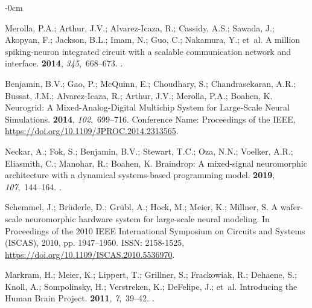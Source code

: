 \documentclass[brainsci, %
               review,submit,pdftex,moreauthors
               ]{Definitions/mdpi}
\begin{document}
\begin{adjustwidth}{-\extralength}{0cm}
\begin{thebibliography}{999}
  Merolla, P.A.; Arthur, J.V.; Alvarez-Icaza, R.; Cassidy, A.S.; Sawada, J.;
    Akopyan, F.; Jackson, B.L.; Imam, N.; Guo, C.; Nakamura, Y.;  et~al.
  \newblock A million spiking-neuron integrated circuit with a scalable
    communication network and interface.
   {\bf 2014}, {\em 345},~668--673.
  .
  
  Benjamin, B.V.; Gao, P.; McQuinn, E.; Choudhary, S.; Chandrasekaran, A.R.;
    Bussat, J.M.; Alvarez-Icaza, R.; Arthur, J.V.; Merolla, P.A.; Boahen, K.
  \newblock Neurogrid: {A} {Mixed}-{Analog}-{Digital} {Multichip} {System} for
    {Large}-{Scale} {Neural} {Simulations}.
   {\bf 2014}, {\em 102},~699--716.
  \newblock Conference Name: Proceedings of the IEEE,
    {\url{https://doi.org/10.1109/JPROC.2014.2313565}}.
  
  Neckar, A.; Fok, S.; Benjamin, B.V.; Stewart, T.C.; Oza, N.N.; Voelker, A.R.;
    Eliasmith, C.; Manohar, R.; Boahen, K.
  \newblock Braindrop: {A} mixed-signal neuromorphic architecture with a
    dynamical systems-based programming model.
   {\bf 2019}, {\em 107},~144--164.
  .
  
  Schemmel, J.; Brüderle, D.; Grübl, A.; Hock, M.; Meier, K.; Millner, S.
  \newblock A wafer-scale neuromorphic hardware system for large-scale neural
    modeling.
  \newblock In Proceedings of the 2010 {IEEE} {International} {Symposium} on
    {Circuits} and {Systems} ({ISCAS}),  2010, pp. 1947--1950.
  \newblock ISSN: 2158-1525, {\url{https://doi.org/10.1109/ISCAS.2010.5536970}}.
  
  Markram, H.; Meier, K.; Lippert, T.; Grillner, S.; Frackowiak, R.; Dehaene, S.;
    Knoll, A.; Sompolinsky, H.; Verstreken, K.; DeFelipe, J.;  et~al.
  \newblock Introducing the {Human} {Brain} {Project}.
   {\bf 2011}, {\em 7},~39--42.
  .
  

\end{thebibliography}
\end{adjustwidth}
\end{document}
